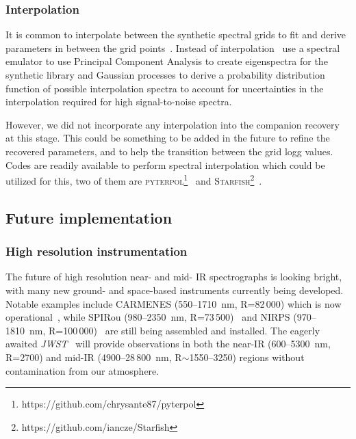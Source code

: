 \documentclass[fleqn,usenatbib]{mnras}
\begin{document}
    \subsubsection{Interpolation}
    \label{subsubsec:interpolation}
    It is common to interpolate between the synthetic spectral grids to fit and derive parameters in between the grid points~\citep[e.g.][]{nemravova_xtauri_2016, passegger_fundamental_2016}. Instead of interpolation~\citet{czekala_constructing_2015} use a spectral emulator to use Principal Component Analysis to create eigenspectra for the synthetic library and Gaussian processes to derive a probability distribution function of possible interpolation spectra to account for uncertainties in the interpolation required for high signal-to-noise spectra.
    
    However, we did not incorporate any interpolation into the companion recovery at this stage. This could be something to be added in the future to refine the recovered parameters, and to help the transition between the grid logg values. Codes are readily available to perform spectral interpolation which could be utilized for this, two of them are \textsc{pyterpol}\footnote{https://github.com/chrysante87/pyterpol}~\citet{nemravova_xtauri_2016} and \textsc{Starfish}\footnote{https://github.com/iancze/Starfish}~\citep{czekala_constructing_2015}.
    
    \subsection{Future implementation}
    \label{subsec:future}
    \subsubsection{High resolution instrumentation}
    \label{subsubsec:highres}
    The future of high resolution near- and mid- IR spectrographs is looking bright, with many new ground- and space-based instruments currently being developed. Notable examples include CARMENES (550--1710~nm, R=82\,000) which is now operational~\citep{quirrenbach_carmenes_2014}, while SPIRou (980--2350~nm, R=73\,500)~\citep{artigau_spirou_2014} and NIRPS (970--1810~nm, R=100\,000)~\citep{bouchy_nearinfrared_2017} are still being assembled and installed. The eagerly awaited \textit{JWST}~\citep{gardner_james_2006} will provide observations in both the near-IR (600--5300~nm, R=2700) and mid-IR (4900--28\,800~nm, R$\sim$1550--3250) regions without contamination from our atmosphere.
    
\end{document}
